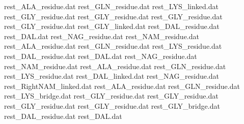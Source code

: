 rest_ALA_residue.dat            
rest_GLN_residue.dat            
rest_LYS_linked.dat             
rest_GLY_residue.dat
rest_GLY_residue.dat
rest_GLY_residue.dat
rest_GLY_residue.dat
rest_GLY_linked.dat
rest_DAL_residue.dat            
rest_DAL.dat                    
rest_NAG_residue.dat            
rest_NAM_residue.dat            
rest_ALA_residue.dat            
rest_GLN_residue.dat            
rest_LYS_residue.dat            
rest_DAL_residue.dat            
rest_DAL.dat                    
rest_NAG_residue.dat            
rest_NAM_residue.dat            
rest_ALA_residue.dat            
rest_GLN_residue.dat            
rest_LYS_residue.dat            
rest_DAL_linked.dat             
rest_NAG_residue.dat            
rest_RightNAM_linked.dat        
rest_ALA_residue.dat            
rest_GLN_residue.dat            
rest_LYS_bridge.dat             
rest_GLY_residue.dat
rest_GLY_residue.dat
rest_GLY_residue.dat
rest_GLY_residue.dat
rest_GLY_bridge.dat
rest_DAL_residue.dat            
rest_DAL.dat                    
